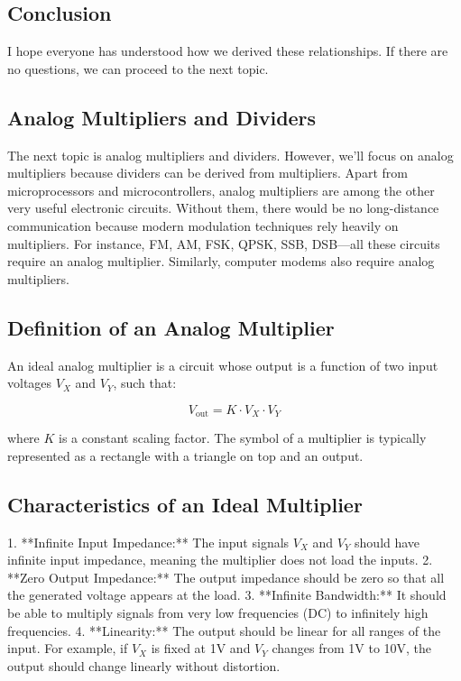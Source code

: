 \subsection*{Conclusion}

I hope everyone has understood how we derived these relationships. If there are no questions, we can proceed to the next topic.

\subsection*{Analog Multipliers and Dividers}

The next topic is analog multipliers and dividers. However, we'll focus on analog multipliers because dividers can be derived from multipliers. Apart from microprocessors and microcontrollers, analog multipliers are among the other very useful electronic circuits. Without them, there would be no long-distance communication because modern modulation techniques rely heavily on multipliers. For instance, FM, AM, FSK, QPSK, SSB, DSB—all these circuits require an analog multiplier. Similarly, computer modems also require analog multipliers.

\subsection*{Definition of an Analog Multiplier}

An ideal analog multiplier is a circuit whose output is a function of two input voltages \( V_X \) and \( V_Y \), such that:

\[
V_{\text{out}} = K \cdot V_X \cdot V_Y
\]

where \( K \) is a constant scaling factor. The symbol of a multiplier is typically represented as a rectangle with a triangle on top and an output.

\subsection*{Characteristics of an Ideal Multiplier}

1. **Infinite Input Impedance:** The input signals \( V_X \) and \( V_Y \) should have infinite input impedance, meaning the multiplier does not load the inputs.
2. **Zero Output Impedance:** The output impedance should be zero so that all the generated voltage appears at the load.
3. **Infinite Bandwidth:** It should be able to multiply signals from very low frequencies (DC) to infinitely high frequencies.
4. **Linearity:** The output should be linear for all ranges of the input. For example, if \( V_X \) is fixed at 1V and \( V_Y \) changes from 1V to 10V, the output should change linearly without distortion.


